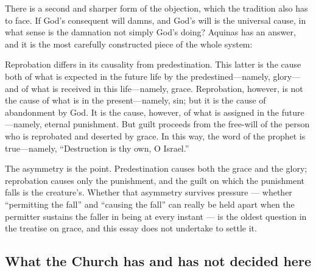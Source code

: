 There is a second and sharper form of the objection, which the tradition also has to face. If God's consequent will damns, and God's will is the universal cause, in what sense is the damnation not simply God's doing? Aquinas has an answer, and it is the most carefully constructed piece of the whole system:

\begin{studyframe}
Reprobation differs in its causality from predestination. This latter is the cause both of what is expected in the future life by the predestined---namely, glory---and of what is received in this life---namely, grace. Reprobation, however, is not the cause of what is in the present---namely, sin; but it is the cause of abandonment by God. It is the cause, however, of what is assigned in the future---namely, eternal punishment. But guilt proceeds from the free-will of the person who is reprobated and deserted by grace. In this way, the word of the prophet is true---namely, ``Destruction is thy own, O Israel.''
\end{studyframe}

The asymmetry is the point. Predestination causes both the grace and the glory; reprobation causes only the punishment, and the guilt on which the punishment falls is the creature's. Whether that asymmetry survives pressure --- whether ``permitting the fall'' and ``causing the fall'' can really be held apart when the permitter sustains the faller in being at every instant --- is the oldest question in the treatise on grace, and this essay does not undertake to settle it.

\subsection{What the Church has and has not decided here}

